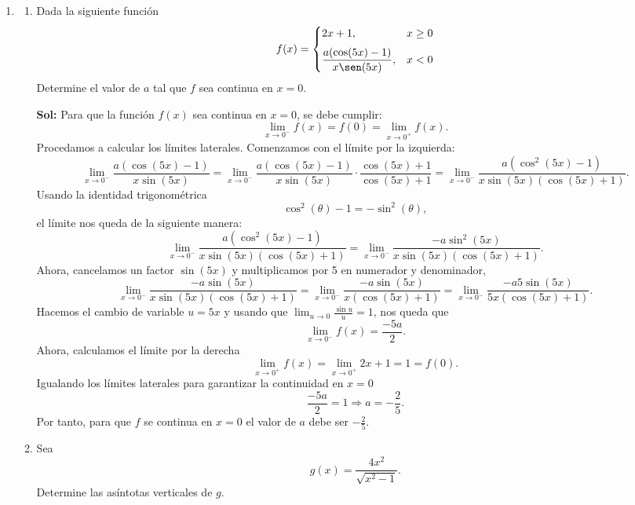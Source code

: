 \documentclass[letterpaper,12pt]{article}
\theoremstyle{plain}
\theoremstyle{definition}
\newcommand{\1}{\mathbbm{1}}
\begin{document}
\begin{enumerate}[label=\textbf{P\arabic*.}, itemsep=0cm]
\begin{enumerate}
\end{enumerate}
\item 
\begin{enumerate}
    \item Dada la siguiente función
    \vspace{-0.3cm}
    \[
    f(x) = 
    \begin{cases} 
\vspace{0.2cm}

    2x + 1, & x \geq 0 \\

    \dfrac{a(\cos(5x) - 1)}{x \sen(5x)}, & x < 0
    \end{cases}
    \]
    Determine el valor de \( a \) tal que \( f \) sea continua en \( x = 0 \).

\color{blue}
\textbf{Sol:}
Para que la función $f(x)$ sea continua en $x = 0$, se debe cumplir:
\[
\lim_{x \to 0^-} f(x) = f(0) = \lim_{x \to 0^+} f(x).
\]
Procedamos a calcular los límites laterales. Comenzamos con el límite por la izquierda:
\[
\lim_{x \to 0^-} \frac{a(\cos(5x)-1)}{x \sin(5x)} = \lim_{x \to 0^-} \frac{a(\cos(5x)-1)}{x \sin(5x)} \cdot \frac{\cos(5x)+1}{\cos(5x)+1} = \lim_{x \to 0^-} \frac{a(\cos^2(5x) - 1)}{x \sin(5x)(\cos(5x)+1)}.
\]
Usando la identidad trigonométrica
\[
\cos^2(\theta) - 1 = -\sin^2(\theta),
\]
el límite nos queda de la siguiente manera:
\[
\lim_{x \to 0^-} \frac{a(\cos^2(5x)-1)}{x \sin(5x)(\cos(5x)+1)} = \lim_{x \to 0^-} \frac{-a \sin^2(5x)}{x \sin(5x)(\cos(5x)+1)}.
\]
Ahora, cancelamos un factor $\sin(5x)$ y multiplicamos por 5 en numerador y denominador,
\[
\lim_{x \to 0^-} \frac{-a \sin(5x)}{x \sin(5x)(\cos(5x)+1)} = \lim_{x \to 0^-} \frac{-a \sin(5x)}{x (\cos(5x)+1)} = \lim_{x \to 0^-} \frac{-a5 \sin(5x)}{5x(\cos(5x)+1)}.
\]
Hacemos el cambio de variable $u = 5x$ y usando que $\lim_{u \to 0} \frac{\sin u}{u} = 1$, nos queda que
\[
\lim_{x \to 0^-} f(x) = \frac{-5a}{2}.
\]
Ahora, calculamos el límite por la derecha
\[
\lim_{x \to 0^+} f(x) = \lim_{x \to 0^+} 2x + 1 = 1 = f(0).
\]
Igualando los límites laterales para garantizar la continuidad en $x = 0$
\[
\frac{-5a}{2} = 1 \Rightarrow a = -\frac{2}{5}.
\]
Por tanto, para que $f$ se continua en $x = 0$ el valor de $a$ debe ser $\boxed{-\frac{2}{5}}$.
\color{black}
    
    \item Sea
    \[
    g(x) = \dfrac{4x^2}{\sqrt{x^2 - 1}}.
    \]
    Determine las asíntotas verticales de \( g \).
    

\end{enumerate}
\end{enumerate}
\end{document}
